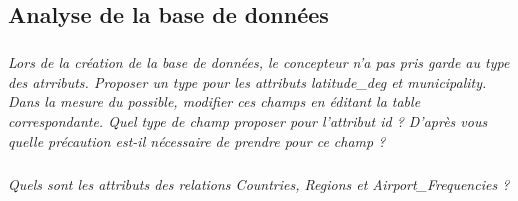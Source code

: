 \documentclass[10pt]{article}
\newif\ifprof
\begin{document}
\subsection*{Analyse de la base de données}
\subparagraph{}
\textit{Lors de la création de la base de données, le concepteur n'a pas pris garde au type des atrributs. Proposer un type pour les attributs \textsf{latitude\_deg} et \textsf{municipality}. Dans la mesure du possible, modifier ces champs en éditant la table correspondante. Quel type de champ proposer pour l'attribut \textsf{id} ? D'après vous quelle précaution est-il nécessaire de prendre pour ce champ ?}

\ifprof
\begin{corrige}
Pour les attributs longitude\_deg et latitude\_deg, il serait préférable d'utiliser le type REAL. 

Pour l'attribut municipality, on peut laisser le type TEXTE. 

Pour l'attribut id, il serait préférable d'utiliser un entier (INT) en imposant une valeur non nulle (NOT NULL) et éventuellement un incrément automatique. . On peut envisager de déclarer cet attribut en clef primaire. 
\end{corrige}
\else
\fi

\subparagraph{}
\textit{Quels sont les attributs des relations \textsf{Countries}, \textsf{Regions} et \textsf{Airport\_Frequencies} ?}
\end{document}
